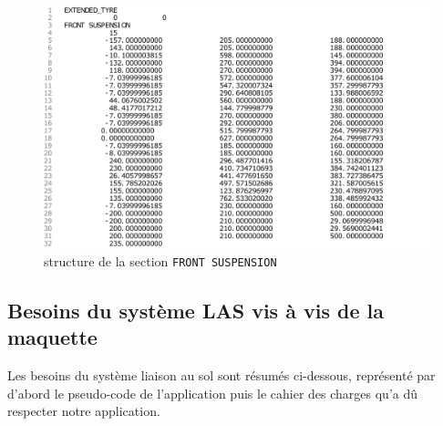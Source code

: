 \begin{figure}
    \centering
    \includegraphics[width=\linewidth]{fichiers/front suspension.pdf}
    \caption{structure de la section \texttt{FRONT SUSPENSION}}
    \label{fig:frontSuspension}
\end{figure}

\newpage
\subsection{Besoins du système LAS vis à vis de la maquette} %

\par Les besoins du système liaison au sol sont résumés ci-dessous, représenté par d'abord le pseudo-code de l'application puis le cahier des charges qu'a dû respecter notre application.\\

